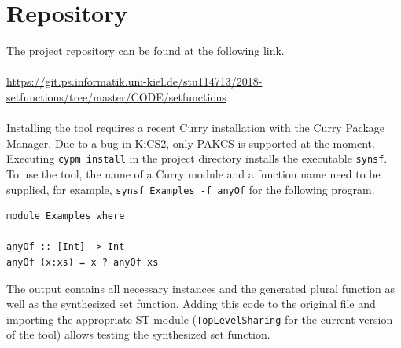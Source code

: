 \documentclass[a4paper, 11pt, fleqn]{scrreprt}
\newcommand{\cinline}[1]{\texttt{#1}}
\begin{document}
\chapter{Repository}
The project repository can be found at the following link.
\\\\
\url{https://git.ps.informatik.uni-kiel.de/stu114713/2018-setfunctions/tree/master/CODE/setfunctions}
\\\\
Installing the tool requires a recent Curry installation with the Curry Package Manager. Due to a bug in KiCS2, only PAKCS is supported at the moment. Executing \cinline{cypm install} in the project directory installs the executable \cinline{synsf}. To use the tool, the name of a Curry module and a function name need to be supplied, for example, \cinline{synsf Examples -f anyOf} for the following program.
\begin{verbatim}
module Examples where

anyOf :: [Int] -> Int
anyOf (x:xs) = x ? anyOf xs
\end{verbatim}
The output contains all necessary instances and the generated plural function as well as the synthesized set function. Adding this code to the original file and importing the appropriate ST module (\cinline{TopLevelSharing} for the current version of the tool) allows testing the synthesized set function. 
\end{document}
